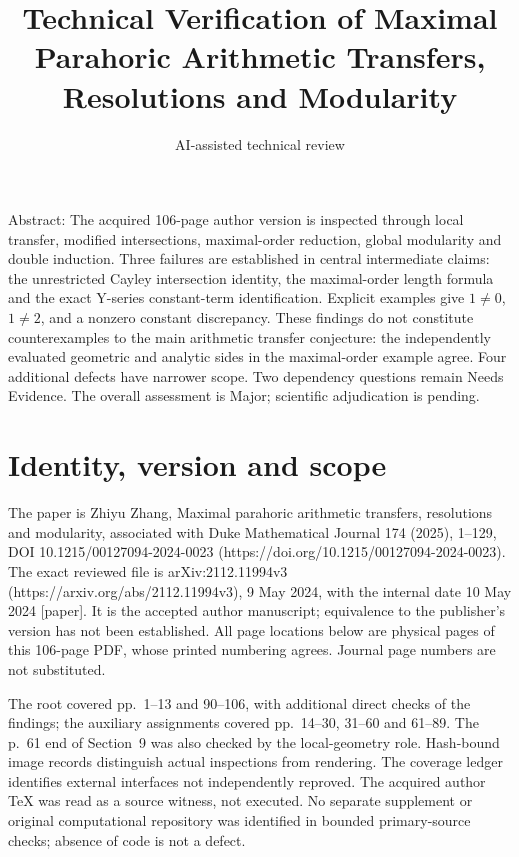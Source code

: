 \documentclass[10pt]{article}
\title{Technical Verification of
Maximal Parahoric Arithmetic Transfers,
Resolutions and Modularity}
\author{AI-assisted technical review}
\date{}
\begin{document}
\maketitle
Abstract: The acquired 106-page author version is inspected through local transfer, modified intersections, maximal-order reduction, global modularity and double induction. Three failures are established in central intermediate claims: the unrestricted Cayley intersection identity, the maximal-order length formula and the exact Y-series constant-term identification. Explicit examples give \(1\ne0\), \(1\ne2\), and a nonzero constant discrepancy. These findings do not constitute counterexamples to the main arithmetic transfer conjecture: the independently evaluated geometric and analytic sides in the maximal-order example agree. Four additional defects have narrower scope. Two dependency questions remain Needs Evidence. The overall assessment is Major; scientific adjudication is pending.\par
\section*{Identity, version and scope}
The paper is Zhiyu Zhang, Maximal parahoric arithmetic transfers, resolutions and modularity, associated with Duke Mathematical Journal 174 (2025), 1–129, DOI 10.1215/00127094-2024-0023 (https://doi.org/10.1215/00127094-2024-0023). The exact reviewed file is arXiv:2112.11994v3 (https://arxiv.org/abs/2112.11994v3), 9 May 2024, with the internal date 10 May 2024 [paper]. It is the accepted author manuscript; equivalence to the publisher’s version has not been established. All page locations below are physical pages of this 106-page PDF, whose printed numbering agrees. Journal page numbers are not substituted.\par
The root covered pp. 1–13 and 90–106, with additional direct checks of the findings; the auxiliary assignments covered pp. 14–30, 31–60 and 61–89. The p. 61 end of Section 9 was also checked by the local-geometry role. Hash-bound image records distinguish actual inspections from rendering. The coverage ledger identifies external interfaces not independently reproved. The acquired author TeX was read as a source witness, not executed. No separate supplement or original computational repository was identified in bounded primary-source checks; absence of code is not a defect.\par
\end{document}
